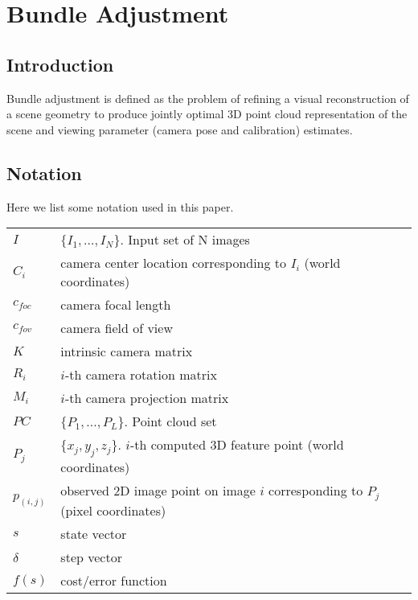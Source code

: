 \chapter{Bundle Adjustment}

\section{Introduction}
Bundle adjustment is defined as the problem of refining a visual reconstruction of a scene geometry
to produce jointly optimal 3D point cloud representation of the scene and viewing parameter
(camera pose and calibration) estimates.

\section{Notation}
Here we list some notation used in this paper. \\

\begin{tabular}{p{1.5cm}p{15cm}p{1cm}}
  $I$ & $\{I_1, ..., I_N\}$. Input set of N images \\
  $C_i$ & camera center location corresponding to $I_i$ (world coordinates) \\
  $c_{foc}$ & camera focal length \\
  $c_{fov}$ & camera field of view \\
  $K$ & intrinsic camera matrix \\
  $R_i$ & $i$-th camera rotation matrix \\
  $M_i$ & $i$-th camera projection matrix \\
  $PC$ & $\{P_1, ..., P_L\}$. Point cloud set \\
  $P_j$ & $\{x_j, y_j, z_j\}$. $i$-th computed 3D feature point (world coordinates) \\
  $p_{(i,j)}$ & observed 2D image point on image $i$ corresponding to $P_j$ (pixel coordinates) \\
  $s$ & state vector \\
  $\delta$ & step vector \\
  $f(s)$ & cost/error function \\
\end{tabular}

